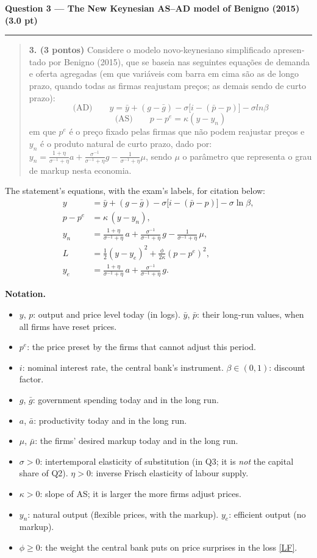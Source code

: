 \documentclass[11pt,a4paper]{article}
\newcommand{\questao}[2]{\par\bigskip\needspace{6\baselineskip}\noindent
  {\large\bfseries\color{blue!55!black}Question #1 --- #2}\par\noindent\rule{\linewidth}{0.3pt}\par}
\newcommand{\enunciado}[1]{\par\smallskip\noindent{\footnotesize\textit{Statement, as printed in the exam:}}%
  \begin{quote}\small\begin{otherlanguage}{portuguese}#1\end{otherlanguage}\end{quote}}
\newenvironment{notacao}{\par\smallskip\noindent\textbf{Notation.}\begin{itemize}[leftmargin=1.4em,topsep=1pt,itemsep=0pt]\small}{\end{itemize}}
\begin{document}
\questao{3}{The New Keynesian AS--AD model of Benigno (2015) (3.0 pt)}
\enunciado{\textbf{3. (3 pontos)} Considere o modelo novo-keynesiano simplificado apresentado por Benigno
(2015), que se baseia nas seguintes equações de demanda e oferta agregadas (em que variáveis com
barra em cima são as de longo prazo, quando todas as firmas reajustam preços; as demais sendo de
curto prazo):
\[\text{(AD)}\qquad y=\bar y+(g-\bar g)-\sigma\big[i-(\bar p-p)\big]-\sigma ln\beta\]
\[\text{(AS)}\qquad p-p^e=\kappa(y-y_n)\]
em que $p^e$ é o preço fixado pelas firmas que não podem reajustar preços e $y_n$ é o produto
natural de curto prazo, dado por:
$y_n=\frac{1+\eta}{\sigma^{-1}+\eta}a+\frac{\sigma^{-1}}{\sigma^{-1}+\eta}g-\frac{1}{\sigma^{-1}+\eta}\mu$,
sendo $\mu$ o parâmetro que representa o grau de markup nesta economia.}
{\small The statement's equations, with the exam's labels, for citation below:}
\begin{align}
y &= \bar y+(g-\bar g)-\sigma\big[i-(\bar p-p)\big]-\sigma\ln\beta, \tag{AD}\label{AD}\\
p-p^e &= \kappa\,(y-y_n), \tag{AS}\label{AS}\\
y_n &= \frac{1+\eta}{\sigma^{-1}+\eta}\,a+\frac{\sigma^{-1}}{\sigma^{-1}+\eta}\,g-\frac{1}{\sigma^{-1}+\eta}\,\mu, \tag{YN}\label{YN}\\
L &= \tfrac12(y-y_e)^2+\frac{\phi}{2\kappa}(p-p^e)^2, \tag{LF}\label{LF}\\
y_e &= \frac{1+\eta}{\sigma^{-1}+\eta}\,a+\frac{\sigma^{-1}}{\sigma^{-1}+\eta}\,g. \tag{YE}\label{YE}
\end{align}

\begin{notacao}
\item $y$, $p$: output and price level today (in logs). $\bar y$, $\bar p$: their long-run values,
when all firms have reset prices.
\item $p^e$: the price preset by the firms that cannot adjust this period.
\item $i$: nominal interest rate, the central bank's instrument. $\beta\in(0,1)$: discount factor.
\item $g$, $\bar g$: government spending today and in the long run.
\item $a$, $\bar a$: productivity today and in the long run.
\item $\mu$, $\bar\mu$: the firms' desired markup today and in the long run.
\item $\sigma>0$: intertemporal elasticity of substitution (in Q3; it is \emph{not} the capital
share of Q2). $\eta>0$: inverse Frisch elasticity of labour supply.
\item $\kappa>0$: slope of AS; it is larger the more firms adjust prices.
\item $y_n$: natural output (flexible prices, with the markup). $y_e$: efficient output (no markup).
\item $\phi\ge0$: the weight the central bank puts on price surprises in the loss \eqref{LF}.
\end{notacao}
\end{document}

